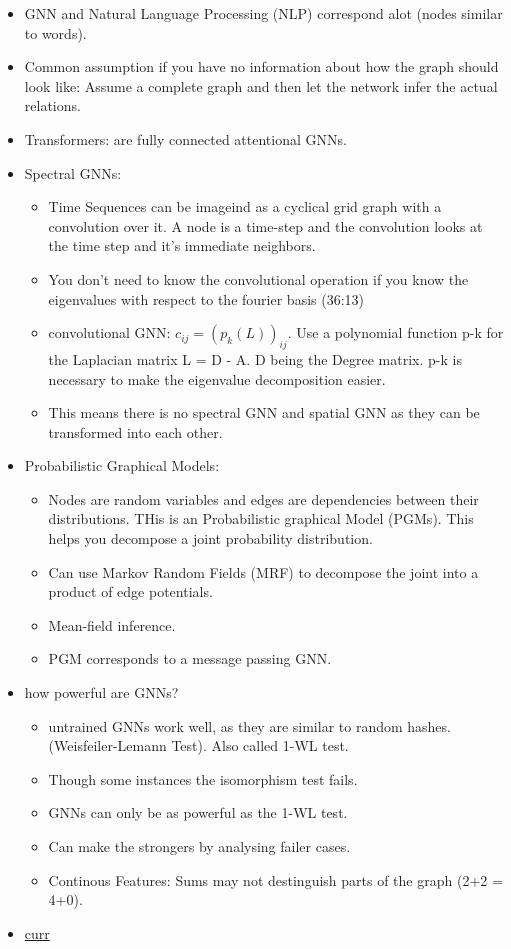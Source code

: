\begin{itemize}[noitemsep,nolistsep]
	\item GNN and Natural Language Processing (NLP) correspond alot (nodes similar to words).
	\item Common assumption if you have no information about how the graph should look like: Assume a complete graph and then let the network infer the actual relations.
	\item Transformers: are fully connected attentional GNNs.
	\item Spectral GNNs:
	\begin{itemize}[noitemsep,nolistsep]
		\item Time Sequences can be imageind as a cyclical grid graph with a convolution over it. A node is a time-step and the convolution looks at the time step and it's immediate neighbors.
		\item You don't need to know the convolutional operation if you know the eigenvalues with respect to the fourier basis (36:13)
		\item convolutional GNN: $c_{ij} = (p_k(L))_{ij}$. Use a polynomial function p-k for the Laplacian matrix L = D - A. D being the Degree matrix. p-k is necessary to make the eigenvalue decomposition easier.
		\item This means there is no spectral GNN and spatial GNN as they can be transformed into each other.
	\end{itemize}
	\item Probabilistic Graphical Models:
	\begin{itemize}[noitemsep,nolistsep]
		\item Nodes are random variables and edges are dependencies between their distributions. THis is an Probabilistic graphical Model (PGMs). This helps you decompose a joint probability distribution.
		\item Can use Markov Random Fields (MRF) to decompose the joint into a product of edge potentials.
		\item Mean-field inference.
		\item PGM corresponds to a message passing GNN.
	\end{itemize}
	\item how powerful are GNNs?
	\begin{itemize}[noitemsep,nolistsep]
		\item untrained GNNs work well, as they are similar to random hashes. (Weisfeiler-Lemann Test). Also called 1-WL test.
		\item Though some instances the isomorphism test fails.
		\item GNNs can only be as powerful as the 1-WL test.
		\item Can make the strongers by analysing failer cases.
		\item Continous Features: Sums may not destinguish parts of the graph (2+2 = 4+0).
	\end{itemize}
	\item \href{https://youtu.be/uF53xsT7mjc?t=2943}{curr}
\end{itemize}

